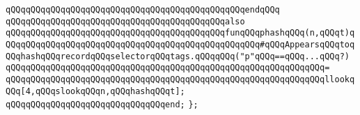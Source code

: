 \verb|qQQqqQQqqQQqqQQqqQQqqQQqqQQqqQQqqQQqqQQqqQQqqQQqendqQQq|\newline
\newline
\verb|qQQqqQQqqQQqqQQqqQQqqQQqqQQqqQQqqQQqqQQqqQQqalso|\newline
\verb|qQQqqQQqqQQqqQQqqQQqqQQqqQQqqQQqqQQqqQQqqQQqfunqQQqphashqQQq(n,qQQqt)qQQqqQQqqQQqqQQqqQQqqQQqqQQqqQQqqQQqqQQqqQQqqQQqqQQq#qQQqAppearsqQQqtoqQQqhashqQQqrecordqQQqselectorqQQqtags.qQQqqQQq("p"qQQq==qQQq...qQQq?)|\newline
\verb|qQQqqQQqqQQqqQQqqQQqqQQqqQQqqQQqqQQqqQQqqQQqqQQqqQQqqQQqqQQqqQQq=|\newline
\verb|qQQqqQQqqQQqqQQqqQQqqQQqqQQqqQQqqQQqqQQqqQQqqQQqqQQqqQQqqQQqqQQqllookqQQq[4,qQQqslookqQQqn,qQQqhashqQQqt];|\newline
\newline
\verb|qQQqqQQqqQQqqQQqqQQqqQQqqQQqqQQqend;|\newline
\verb|};|\newline
\newline

